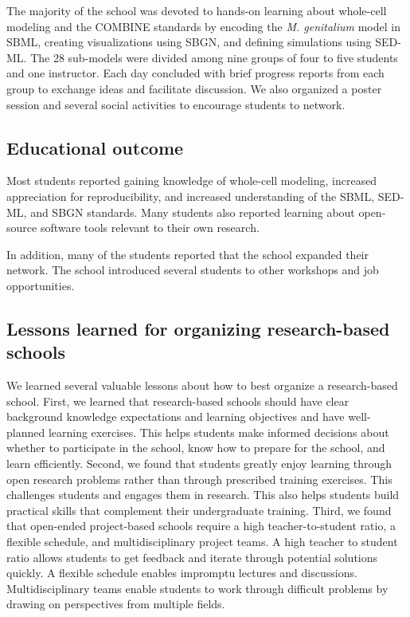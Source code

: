 \documentclass[journal,transmag]{IEEEtran}
\begin{document}
The majority of the school was devoted to hands-on learning about whole-cell modeling and the COMBINE standards by encoding the \textit{M. genitalium} model in SBML, creating visualizations using SBGN, and defining simulations using SED-ML. The 28 sub-models were divided among nine groups of four to five students and one instructor.
Each day concluded with brief progress reports from each group to exchange ideas and facilitate discussion.
We also organized a poster session and several social activities to encourage students to network.

\subsection{Educational outcome}
Most students reported gaining knowledge of whole-cell modeling, increased appreciation for reproducibility, and increased understanding of the SBML, SED-ML, and SBGN standards. Many students also reported learning about open-source software tools relevant to their own research.

In addition, many of the students reported that the school expanded their network. The school introduced several students to other workshops and job opportunities.

\subsection{Lessons learned for organizing research-based schools}
We learned several valuable lessons about how to best organize a research-based school. First, we learned that research-based schools should have clear background knowledge expectations and learning objectives and have well-planned learning exercises. This helps students make informed decisions about whether to participate in the school, know how to prepare for the school, and learn efficiently.
Second, we found that students greatly enjoy learning through open research problems rather than through prescribed training exercises. This challenges students and engages them in research. This also helps students build practical skills that complement their undergraduate training.
Third, we found that open-ended project-based schools require a high teacher-to-student ratio, a flexible schedule, and multidisciplinary project teams. A high teacher to student ratio allows students to get feedback and iterate through potential solutions quickly. A flexible schedule enables impromptu lectures and discussions. Multidisciplinary teams enable students to work through difficult problems by drawing on perspectives from multiple fields. 
\end{document}
